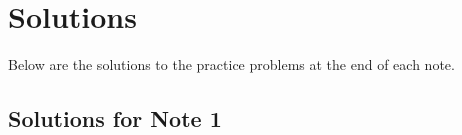 \documentclass[../../main.tex]{subfiles}
\begin{document}
\chapter{Solutions}

Below are the solutions to the practice problems at the end of
each note.

\section{Solutions for Note 1}
\end{document}
